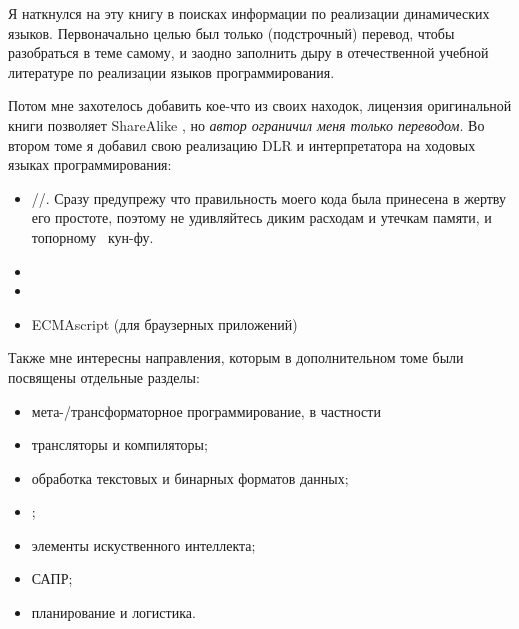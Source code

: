 \secdown{}

Я наткнулся на эту книгу в поисках информации по реализации динамических языков.
Первоначально целью был только (подстрочный) перевод, чтобы разобраться в теме
самому, и заодно заполнить дыру в отечественной учебной литературе по реализации
языков программирования.

Потом мне захотелось добавить кое-что из своих находок, лицензия
оригинальной книги
позволяет ShareAlike , но \emph{автор ограничил меня только
переводом}. Во втором томе я добавил свою реализацию DLR
и интерпретатора на ходовых языках программирования:
\begin{itemize}[nosep]
  \item 
\flex/\bison/\cpp. Сразу предупрежу что правильность моего кода была принесена в
жертву его простоте, поэтому не удивляйтесь диким расходам и утечкам памяти, и
топорному \cpp\ кун-фу.
\item \py
\item \java
\item ECMAscript (для браузерных приложений)
\end{itemize}

\bigskip
Также мне интересны направления, которым в дополнительном томе были посвящены
отдельные разделы:
\begin{itemize}[nosep]
  \item мета-/трансформаторное программирование, в частности
  \item трансляторы и компиляторы;
  \item обработка текстовых и бинарных форматов данных;
  \item {};
  \item элементы искуственного интеллекта;
  \item САПР;
  \item планирование и логистика.
\end{itemize}

\secup